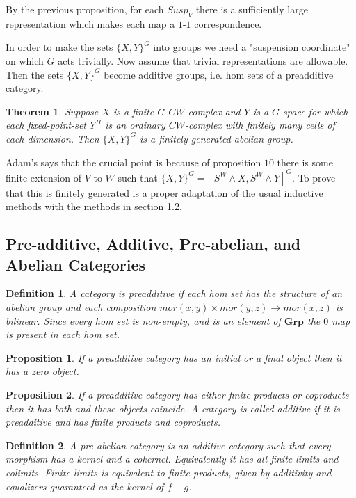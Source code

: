 \documentclass{article}
\theoremstyle{problemstyle}
\theoremstyle{problemstyle}
\newtheorem{definition}{Definition}
\theoremstyle{problemstyle}
\theoremstyle{problemstyle}
\theoremstyle{problemstyle}
\newtheorem{proposition}{Proposition}
\theoremstyle{problemstyle}
\newtheorem{theorem}{Theorem}
\begin{document}
By the previous proposition, for each $Susp_V$ there is a sufficiently large representation which makes each map a $1$-$1$ correspondence. 

In order to make the sets $\{X,Y\}^G$ into groups we need a "suspension coordinate" on which $G$ acts trivially. Now assume that trivial representations are allowable. Then the sets $\{X,Y\}^G$ become additive groups, i.e. hom sets of a preadditive category.  

\begin{theorem}
Suppose $X$ is a finite $G$-$CW$-complex and $Y$ is a $G$-space for which each fixed-point-set $Y^H$ is an ordinary $CW$-complex with finitely many cells of each dimension. Then $\{X,Y\}^G$ is a finitely generated abelian group. 
\end{theorem}

Adam's says that the crucial point is because of proposition $10$ there is some finite extension of $V$ to $W$ such that $\{X,Y\}^G = [S^W \wedge X,S^W \wedge Y]^G$. To prove that this is finitely generated is a proper adaptation of the usual inductive methods with the methods in section 1.2. 

\subsection{Pre-additive, Additive, Pre-abelian, and Abelian Categories}

\begin{definition}
A category is preadditive if each hom set has the structure of an abelian group and each composition $mor(x,y) \times mor(y,z) \rightarrow mor(x,z)$ is bilinear. Since every hom set is non-empty, and is an element of $\textbf{Grp}$ the $0$ map is present in each hom set.  
\end{definition}

\begin{proposition}
If a preadditive category has an initial or a final object then it has a zero object. 
\end{proposition}

\begin{proposition}
If a preadditive category has either finite products or coproducts then it has both and these objects coincide. A category is called additive if it is preadditive and has finite products and coproducts. 
\end{proposition}

\begin{definition}
A pre-abelian category is an additive category such that every morphism has a kernel and a cokernel. Equivalently it has all finite limits and colimits. Finite limits is equivalent to finite products, given by additivity and equalizers guaranteed as the kernel of $f-g$.
\end{definition}
\end{document}
